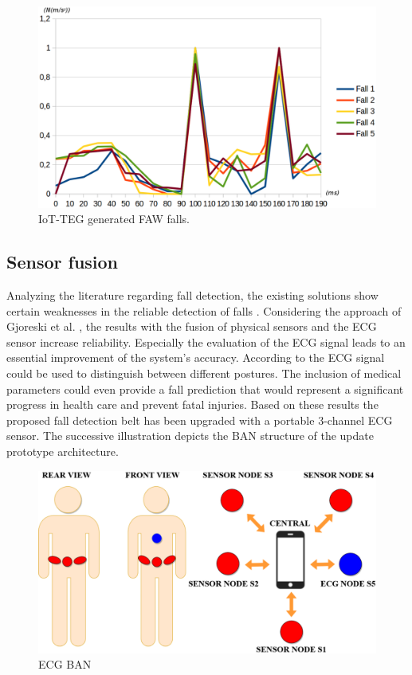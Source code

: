 \documentclass[10pt,journal,compsoc]{IEEEtran}
\begin{document}
\begin{figure}[!ht]
	\centering
	\includegraphics[scale=0.22]{Images/IoTTEGFAWGeneratedEvents.eps}
	\caption[IoT-TEG generated FAW falls]{IoT-TEG generated FAW falls.}
	\label{fig:IoTTEGFAWGeneratedEvents}
\end{figure}

\subsection{Sensor fusion}
\label{subsec:sensorfusion}	
Analyzing the literature regarding fall detection, the existing solutions show certain weaknesses in the reliable detection of falls \cite{Igual2013, Li2009, Luder2009, Pannurat2014, jamsa2014fall}. Considering the approach of Gjoreski et al. \cite{Gjoreski2014}, the results with the fusion of physical sensors and the ECG sensor increase reliability. Especially the evaluation of the ECG signal leads to an essential improvement of the system's accuracy.  According to \cite{Gjoreski2014} the ECG signal could be used to distinguish between different postures. The inclusion of medical parameters could even provide a fall prediction that would represent a significant progress in health care and prevent fatal injuries. Based on these results the proposed fall detection belt has been upgraded with a portable 3-channel ECG sensor. The successive illustration depicts the BAN structure of the update prototype architecture.
\begin{figure}[!ht]
	\centering
	\includegraphics[scale=0.26]{Images/ECG-BAN.eps}
	\caption[ECG BAN]{ECG BAN}
	\label{fig:ECGBAN}
\end{figure}
\end{document}

